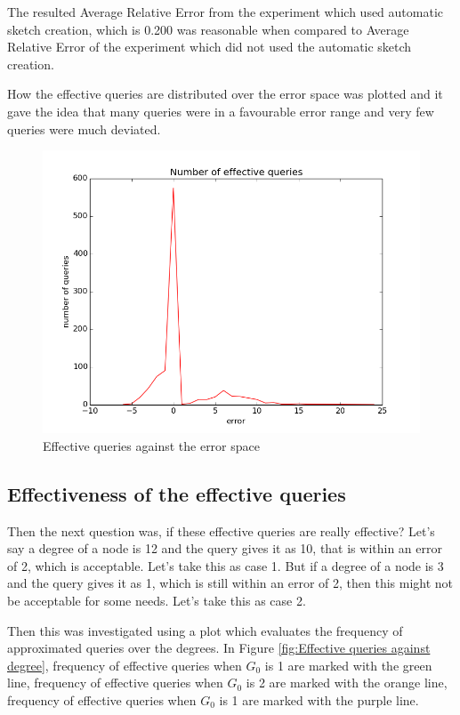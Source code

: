 \documentclass[conference]{IEEEtran}
\begin{document}
The resulted Average Relative Error from the experiment which used automatic sketch creation, which is 0.200 was reasonable when compared to Average Relative Error  of the experiment which did not used the automatic sketch creation. 


How the effective queries are distributed over the error space was plotted and it gave the idea that many queries were in a favourable error range and very few queries were much deviated.

\begin{figure}[!t]
\centering
\includegraphics[width=\linewidth]{deviation-plot-AS-2init-2scale-0t-n1000-e10000-sketches-811-821-823-827-829-839plot}
\caption{ Effective queries against the error space }
\end{figure}

\subsection{Effectiveness of the effective queries }

Then the next question was, if these effective queries are really effective? Let's say a degree of a node is 12 and the query gives it as 10, that is within an error of 2, which is acceptable. Let's take this as case 1. But if a degree of a node is 3 and the query gives it as 1, which is still within an error of 2, then this might not be acceptable for some needs. Let's take this as case 2.


Then this was investigated using a plot which evaluates the frequency of approximated queries over the degrees. In Figure \ref{fig:Effective queries against degree}, frequency of effective queries when $G_0$ is 1 are marked with the green line, frequency of effective queries when $G_0$ is 2 are marked with the orange line, frequency of effective queries when $G_0$ is 1 are marked with the purple line. 
\end{document}
